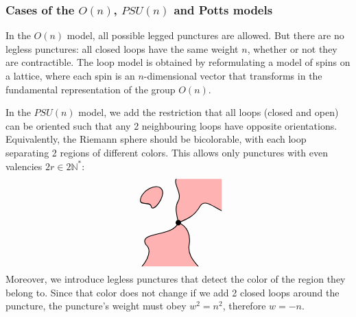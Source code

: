 \documentclass[12pt, a4paper]{article}
\begin{document}
\subsubsection{Cases of the $O(n)$, $PSU(n)$ and Potts models}\label{sec:coup}

In the $O(n)$ model, all possible legged punctures are allowed. But there are no legless punctures: all closed loops have the same weight $n$, whether or not they are contractible. The loop model is obtained by reformulating a model of spins on a lattice, where each spin is an $n$-dimensional vector that transforms in the fundamental representation of the group $O(n)$. 

In the $PSU(n)$ model, we add the restriction that all loops (closed and open) can be oriented such that any 2 neighbouring loops have opposite orientations. Equivalently, the Riemann sphere should be bicolorable, with each loop separating 2 regions of different colors. This allows only punctures with even valencies $2r\in 2\mathbb{N}^*$:
\begin{align}
 \begin{tikzpicture}[baseline=(current  bounding  box.center), scale = .4]
 \clip (-4, -4) rectangle (4, 4);
  \filldraw[thick, fill = red!30] (0, 0) to [out = 100, in = -120] (0, 2) to [out = 60, in = -150] (0, 4.2) -- (4.2, 4.2) -- (4.2, 1) to [out = 160, in = 60] (2, 1.5) to [out = -120, in = 20] (0, 0);
  \filldraw[thick, fill = red!30] (0, 0) to [out = -20, in = 80] (1, -2) to [out = -100, in = 130] (2, -4.2) -- (-3.5, -4.2) to [out = 50, in = -40] (-3, -2) to [out = 120, in = -110] (0, 0);
  \filldraw[thick, fill = red!30] (-3.5, 2) to [out = 90, in = 120] (-1.5, 3) to [out = -60, in = -80] (-2.5, 1.5) to [out = 100, in = -90] (-3.5, 2);
   \draw (0, 0) node[fill, circle, minimum size = 2mm, inner sep = 0]{};
 \end{tikzpicture}
\end{align}
Moreover, we introduce legless punctures that detect the color of the region they belong to. Since that color does not change if we add 2 closed loops around the puncture, the puncture's weight must obey $w^2=n^2$, therefore $w=-n$. 
\end{document}
